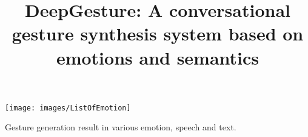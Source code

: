 \documentclass[sigconf]{acmart}
\begin{document}
\title{DeepGesture: A conversational gesture synthesis system based on emotions and semantics}









\begin{teaserfigure}
	\centering
  \texttt{[image: images/ListOfEmotion]}
  \caption{Gesture generation result in various emotion, speech and text.}
  \label{fig:teaser}
\end{teaserfigure}

\maketitle







%
%



%




%
\appendix
\renewcommand{\sectionautorefname}{Appendix}
\renewcommand{\subsectionautorefname}{Appendix}
\renewcommand{\subsubsectionautorefname}{Appendix}


\end{document}
